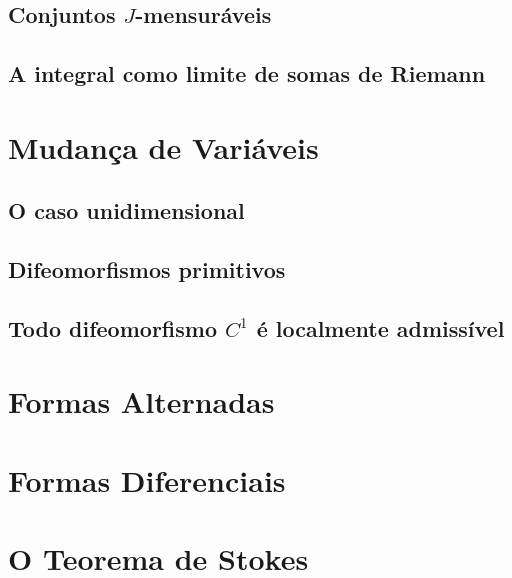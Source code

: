 \documentclass{article}
\begin{document}
\subsection{Conjuntos \(J\)-mensuráveis}
\subsection{A integral como limite de somas de Riemann}

\section{Mudança de Variáveis}
\subsection{O caso unidimensional}
\subsection{Difeomorfismos primitivos}
\subsection{Todo difeomorfismo \(C^1\) é localmente admissível}

\section{Formas Alternadas}

\section{Formas Diferenciais}

\section{O Teorema de Stokes}
\end{document}
